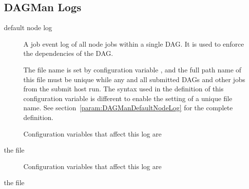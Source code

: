 \subsection{\label{sec:DAGMan-logs}DAGMan Logs}
\begin{description}

\item[default node log]
  A job event log of all node jobs within a single DAG.
  It is used to enforce the dependencies of the DAG.

  The file name is set by configuration variable 
  , 
  and the full path name of this file must be unique while any and 
  all submitted DAGs  and other jobs from the submit host run.
  The syntax used in the definition of this configuration variable is
  different to enable the setting of a unique file name.
  See section~\ref{param:DAGManDefaultNodeLog} for the complete definition.

  Configuration variables that affect this log are
  \begin{description}
  \item [] 
  \end{description}

\item[the  file]
  Configuration variables that affect this log are
  \begin{description}
  \item [] 
  \item [] 
  \end{description}

\item[the  file]
  

\end{description}

\MoreTodo

